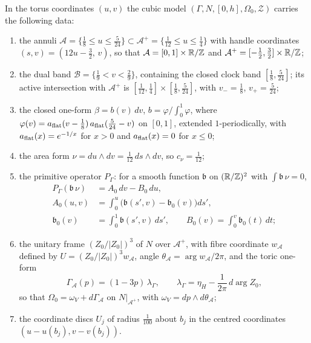 \begin{proposition}\label{prop:cub-handle}
In the torus coordinates $(u,v)$ the cubic model $(\Gamma,N,[0,h],\Omega_0,\mathcal Z)$ carries the following data:
\begin{enumerate}[label=(\alph*)]
\item the annuli $\mathcal A=\{\frac18\le u\le\frac5{24}\}\subset\mathcal A^+=\{\frac1{12}\le u\le\frac14\}$ with handle
coordinates $(s,v)=(12u-\frac32,\,v)$, so that $\mathcal A=[0,1]\times\mathbb{R}/\mathbb{Z}$ and $\mathcal A^+=[-\frac12,\frac32]\times\mathbb{R}/\mathbb{Z}$;
\item the dual band $\mathcal B=\{\frac19<v<\frac29\}$, containing the closed clock band $[\frac18,\frac5{24}]$; its active intersection with $\mathcal A^+$ is $[\frac1{12},\frac14]\times[\frac18,\frac5{24}]$, with $v_-=\frac18$, $v_+=\frac5{24}$;
\item the closed one-form $\beta=b(v)\,dv$, $b=\varphi/\int_0^1\varphi$, where
$\varphi(v)=a_{\rm flat}(v-\frac18)\,a_{\rm flat}(\frac5{24}-v)$ on $[0,1]$, extended $1$-periodically, with
$a_{\rm flat}(x)=e^{-1/x}$ for $x>0$ and $a_{\rm flat}(x)=0$ for $x\le0$;
\item the area form $\nu=du\wedge dv=\frac1{12}\,ds\wedge dv$, so $c_\nu=\frac1{12}$;
\item the primitive operator $P_\Gamma$: for a smooth function $\mathfrak b$ on $(\mathbb{R}/\mathbb{Z})^2$ with $\int\mathfrak b\,\nu=0$,
\[
\begin{aligned}
 P_\Gamma(\mathfrak b\,\nu)&=A_0\,dv-B_0\,du,\\
 A_0(u,v)&=\int_0^u\big(\mathfrak b(s',v)-\mathfrak b_0(v)\big)ds',\\
 \mathfrak b_0(v)&=\int_0^1\mathfrak b(s',v)\,ds',\qquad B_0(v)=\int_0^v\mathfrak b_0(t)\,dt;
\end{aligned}
\]
\item the unitary frame $(Z_0/|Z_0|)^3$ of $N$ over $\mathcal A^+$, with fibre coordinate $w_{\mathcal A}$ defined by
$U=(Z_0/|Z_0|)^3w_{\mathcal A}$, angle $\theta_{\mathcal A}=\arg w_{\mathcal A}/2\pi$, and the toric one-form
\[
 \Gamma_{\mathcal A}(p)=(1-3p)\,\lambda_\Gamma,\qquad \lambda_\Gamma=\eta_H-\frac1{2\pi}\,d\arg Z_0 ,
\]
so that $\Omega_0=\omega_V+d\Gamma_{\mathcal A}$ on $N|_{\mathcal A^+}$, with $\omega_V=dp\wedge d\theta_{\mathcal A}$;
\item the coordinate discs $U_j$ of radius $\frac1{100}$ about $b_j$ in the centred coordinates
$(u-u(b_j),v-v(b_j))$.
\end{enumerate}
\end{proposition}

